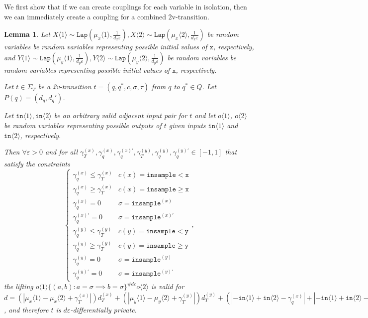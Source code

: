 \documentclass[12pt]{article}
\newcommand{\gguard}[1][x]{\texttt{insample}\geq#1}
\newcommand{\lguard}[1][x]{\texttt{insample} < #1}
\newcommand{\brangle}[1]{\langle#1 \rangle}
\newcommand{\Lap}{\texttt{Lap}}
\newtheorem{lemma}[thm]{Lemma}
\theoremstyle{definition}
\begin{document}
We first show that if we can create couplings for each variable in isolation, then we can immediately create a coupling for a combined 2v-transition. 

\begin{lemma}\label{mvParallelCouplingsLemma}
    Let $X\brangle{1}\sim \Lap(\mu_x\brangle{1}, \frac{1}{d_x\varepsilon}), X\brangle{2}\sim\Lap(\mu_x\brangle{2}, \frac{1}{d_x\varepsilon})$ be random variables be random variables representing possible initial values of $\texttt{x}$, respectively, 
    and $Y\brangle{1}\sim \Lap(\mu_y\brangle{1}, \frac{1}{d_y\varepsilon}), Y\brangle{2}\sim\Lap(\mu_y\brangle{2}, \frac{1}{d_y\varepsilon})$ be random variables be random variables representing possible initial values of $\texttt{x}$, respectively. 

    Let $t\in \Sigma_T$ be a 2v-transition $t = (q, q^*, c, \sigma, \tau)$ from $q$ to $q^*\in Q$. Let $P(q) = (d_q, d_q')$.

    Let $\texttt{in}\brangle{1}, \texttt{in}\brangle{2}$ be an arbitrary valid adjacent input pair for $t$ and let $o\brangle{1}$, $o\brangle{2}$ be random variables representing possible outputs of $t$ given inputs $\texttt{in}\brangle{1}$ and $\texttt{in}\brangle{2}$, respectively. 

    Then $\forall \varepsilon>0$ and for all $\gamma_T^{(x)}, \gamma_q^{(x)}, \gamma_q^{(x)\prime},\gamma_T^{(y)}, \gamma_q^{(y)}, \gamma_q^{(y)\prime}\in [-1, 1]$ that satisfy the constraints \[
        \begin{cases}
          \gamma_q^{(x)}\leq\gamma_T^{(x)} & c(x) = \lguard[\texttt{x}]\\
          \gamma_q^{(x)}\geq\gamma_T^{(x)} & c(x) = \gguard[\texttt{x}]\\
          \gamma_q^{(x)}=0 & \sigma = \texttt{insample}^{(x)}\\
          \gamma_q^{(x)\prime}=0 & \sigma = \texttt{insample}^{(x)\prime}\\
          \gamma_q^{(y)}\leq\gamma_T^{(y)} & c(y) = \lguard[\texttt{y}]\\
          \gamma_q^{(y)}\geq\gamma_T^{(y)} & c(y) = \gguard[\texttt{y}]\\
          \gamma_q^{(y)}=0 & \sigma = \texttt{insample}^{(y)}\\
          \gamma_q^{(y)\prime}=0 & \sigma = \texttt{insample}^{(y)\prime}
        \end{cases},
      \]
      the lifting $o\brangle{1}\{(a, b): a=\sigma\implies b=\sigma\}^{\#d\varepsilon}o\brangle{2}$ is valid for 
      $d = (|\mu_x\brangle{1}-\mu_x\brangle{2}+\gamma_T^{(x)}|)d_T^{(x)}+(|\mu_y\brangle{1}-\mu_y\brangle{2}+\gamma_T^{(y)}|)d_T^{(y)}+(|-\texttt{in}\brangle{1}+\texttt{in}\brangle{2}-\gamma_q^{(x)}|+|-\texttt{in}\brangle{1}+\texttt{in}\brangle{2}-\gamma_q^{(y)}|)d_q+(|-\texttt{in}\brangle{1}+\texttt{in}\brangle{2}-\gamma_q^{(x)\prime}|+|-\texttt{in}\brangle{1}+\texttt{in}\brangle{2}-\gamma_q^{(y)\prime}|)d_q'$, and therefore $t$ is $d\varepsilon$-differentially private. 
\end{lemma}
\end{document}
